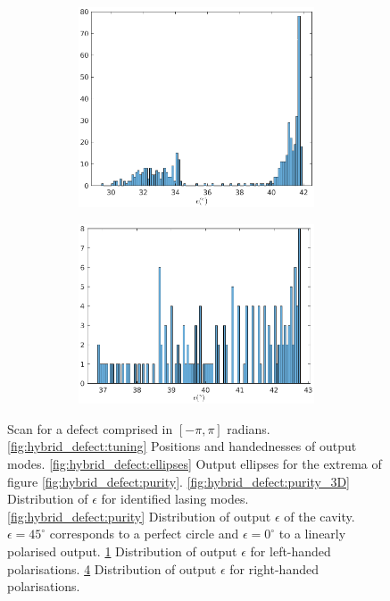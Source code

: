 \begin{figure}
\begin{subfigure}{0.49\linewidth}
		\begin{subfigure}{\linewidth}
			\includegraphics[width=\linewidth]{plots/hybrid_defect/purity_lh}
			\caption{}
			\label{fig:hybrid_defect:purity_lh}
		\end{subfigure}
		\begin{subfigure}{\linewidth}
			\includegraphics[width=\linewidth]{plots/hybrid_defect/purity_rh}
			\caption{}
			\label{fig:hybrid_defect:purity_rh}
		\end{subfigure}
	\end{subfigure}
	\caption[Scan through the possible defects of hybrid defect cavity]{Scan for a defect comprised in $[-\pi, \pi]$ radians. \ref{fig:hybrid_defect:tuning} Positions and handednesses of output modes. \ref{fig:hybrid_defect:ellipses} Output ellipses for the extrema of figure \ref{fig:hybrid_defect:purity}. \ref{fig:hybrid_defect:purity_3D} Distribution of $\epsilon$ for identified lasing modes. \ref{fig:hybrid_defect:purity} Distribution of output $\epsilon$ of the cavity. $\epsilon = 45^\circ$ corresponds to a perfect circle and $\epsilon=0^\circ$ to a linearly polarised output. \ref{fig:hybrid_defect:purity_lh} Distribution of output $\epsilon$ for left-handed polarisations. \ref{fig:hybrid_defect:purity_rh} Distribution of output $\epsilon$ for right-handed polarisations.}

\end{figure}
